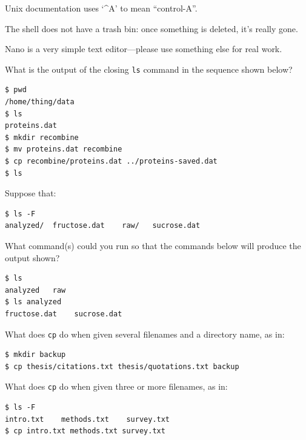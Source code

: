 \documentclass{book}
\begin{document}
\begin{keypoints}
\begin{swcitemize}
\item
  Unix documentation uses `\^{}A' to mean ``control-A''.
\item
  The shell does not have a trash bin: once something is deleted, it's
  really gone.
\item
  Nano is a very simple text editor---please use something else for real
  work.
\end{swcitemize}
\end{keypoints}

\begin{challenge}
  What is the output of the closing \texttt{ls} command in the sequence
  shown below?

\begin{verbatim}
$ pwd
/home/thing/data
$ ls
proteins.dat
$ mkdir recombine
$ mv proteins.dat recombine
$ cp recombine/proteins.dat ../proteins-saved.dat
$ ls
\end{verbatim}
\end{challenge}

\begin{challenge}
  Suppose that:

\begin{verbatim}
$ ls -F
analyzed/  fructose.dat    raw/   sucrose.dat
\end{verbatim}

  What command(s) could you run so that the commands below will produce
  the output shown?

\begin{verbatim}
$ ls
analyzed   raw
$ ls analyzed
fructose.dat    sucrose.dat
\end{verbatim}
\end{challenge}

\begin{challenge}
  What does \texttt{cp} do when given several filenames and a directory
  name, as in:

\begin{verbatim}
$ mkdir backup
$ cp thesis/citations.txt thesis/quotations.txt backup
\end{verbatim}

  What does \texttt{cp} do when given three or more filenames, as in:

\begin{verbatim}
$ ls -F
intro.txt    methods.txt    survey.txt
$ cp intro.txt methods.txt survey.txt
\end{verbatim}
\end{challenge}
\end{document}
